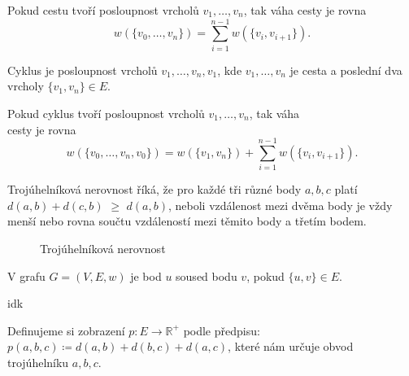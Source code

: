 \begin{definition}
    \label{definice:vaha_cesty}
    Pokud cestu tvoří posloupnost vrcholů $v_1, \ldots, v_n$, tak váha cesty je rovna \[ w(\{v_0,\dots ,v_n\}) = \sum_{i=1}^{n-1}w(\{v_i, v_{i+1}\}). \]
    
\end{definition}

\begin{definition}[Cyklus]
    \label{definice:cyklus}
    Cyklus je posloupnost vrcholů $v_1,\ldots,v_n,v_1$, kde $v_1,\ldots,v_n$ je cesta a poslední dva vrcholy $\{v_1,v_n\} \in E$.
\end{definition}

\begin{definition}
    \label{definice:vaha_cyklu}
    Pokud cyklus tvoří posloupnost vrcholů $v_1, \ldots, v_n$, tak váha \\cesty je rovna \[ w(\{v_0,\dots ,v_n, v_0\}) = w(\{v_1, v_n\}) + \sum_{i=1}^{n-1}w(\{v_i, v_{i+1}\}). \]
    
\end{definition}

\begin{definition}
    \label{definice:trojuhelnikova_nerovnost}
    Trojúhelníková nerovnost říká, že pro každé tři různé body $a, b, c$ platí \textcolor{myblue}{$d(a, b)+d(c, b)$} $\geq$ \textcolor{myred}{$d(a,b)$}, neboli vzdálenost mezi dvěma body je vždy menší nebo rovna součtu vzdáleností mezi těmito body a třetím bodem. 

    \begin{figure}[h]
        \centering
        \caption{Trojúhelníková nerovnost}
    \end{figure}

\end{definition}
\begin{definition}[Soused]
    \label{definice:soused}
    V grafu $G = (V, E, w)$ je bod $u$ soused bodu $v$, pokud $\{u, v\} \in E$.
\end{definition}

\begin{definition}
    \label{definice:bigonotation}
    idk
\end{definition}

\begin{definition}
    \label{definice:obvod_troj}
    Definujeme si zobrazení $p: E\rightarrow \mathbb{R}^+$ podle předpisu: $p(a, b, c) \coloneqq d(a, b) + d(b, c) + d(a, c)$, které nám určuje obvod trojúhelníku $a, b, c$.
\end{definition}